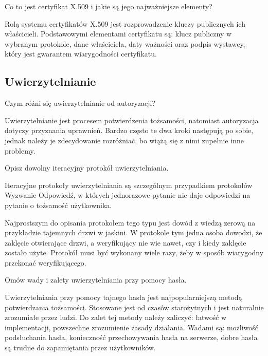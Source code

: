 \documentclass[answers,11pt]{exam}
\begin{document}
\begin{questions}
\question Co to jest certyfikat X.509 i jakie są jego najważniejsze elementy?
\begin{solution}
Rolą systemu certyfikatów X.509 jest rozprowadzenie kluczy publicznych ich właścicieli. Podstawowymi elementami certyfikatu są: klucz publiczny w wybranym protokole, dane właściciela, daty ważności oraz podpis wystawcy, który jest gwarantem wiarygodności certyfikatu.
\end{solution}

\end{questions}


\subsection{Uwierzytelnianie}

\begin{questions}


\question Czym różni się uwierzytelnianie od autoryzacji?
\begin{solution}
Uwierzytelnianie jest procesem potwierdzenia tożsamości, natomiast autoryzacja dotyczy przyznania uprawnień. Bardzo często te dwa kroki następują po sobie, jednak należy je zdecydowanie rozróżniać, bo wiążą się z nimi zupełnie inne problemy.
\end{solution}

\question Opisz dowolny iteracyjny protokół uwierzytelniania.
\begin{solution}
Iteracyjne protokoły uwierzytelniania są szczególnym przypadkiem protokołów Wyzwanie-Odpowiedź, w których jednorazowe pytanie nie daje odpowiedzi na pytanie o tożsamość użytkownika. 

Najprostszym do opisania protokołem tego typu jest dowód z wiedzą zerową na przykładzie tajemnych drzwi w jaskini. W protokole tym jedna osoba dowodzi, że zaklęcie otwierające drzwi, a weryfikujący nie wie nawet, czy i kiedy zaklęcie zostało użyte. Protokół musi być wykonany wiele razy, żeby w sposób wiarygodny przekonać weryfikującego.
\end{solution}

\question Omów wady i zalety uwierzytelniania przy pomocy hasła.
\begin{solution}
Uwierzytelniania przy pomocy tajnego hasła jest najpopularniejszą metodą potwierdzania tożsamości. Stosowane jest od czasów starożytnych i jest naturalnie zrozumiałe przez ludzi. 
Do zalet tej metody należy zaliczyć: łatwość w implementacji, powszechne zrozumienie zasady działania.
Wadami są: możliwość podsłuchania hasła, konieczność przechowywania hasła na serwerze, dobre hasła są trudne do zapamiętania przez użytkowników.
\end{solution}


\end{questions}
\end{document}
